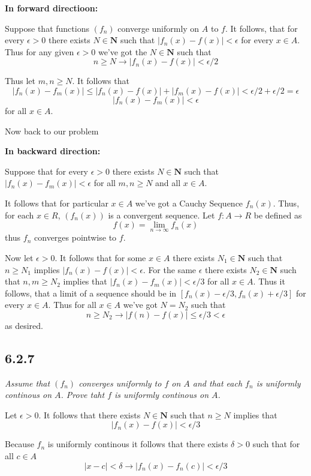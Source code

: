 \documentclass[11pt,oneside,titlepage]{book}
\begin{document}
\textbf{In forward directioon:}

Suppose that functions $(f_n)$ converge uniformly on $A$ to $f$. It follows,
that for every $\epsilon > 0$ there exists $N \in \textbf{N}$ such that
$|f_n(x) - f(x)| < \epsilon$ for every $x \in A$. Thus for any given
$\epsilon > 0$ we've got the $N \in \textbf{N}$ such that
$$n \geq N \to |f_n(x) - f(x)| < \epsilon / 2$$

Thus let $m, n \geq N$. It follows that
$$|f_n(x) - f_m(x)| \leq |f_n(x) - f(x)| + |f_m(x) - f(x)| < \epsilon/2 + \epsilon/2 = \epsilon$$
$$|f_n(x) - f_m(x)| <  \epsilon$$
for all $x \in A$.

Now back to our problem

\textbf{In backward direction:}

Suppose that for every $\epsilon > 0$ there exists $N \in \textbf{N}$ such
that $|f_n(x) - f_m(x)| < \epsilon$ for all $m, n \geq N$ and all $x \in A$.

It follows that for particular $x \in A$ we've got a Cauchy Sequence
$f_n(x)$. Thus, for each $x \in R$, $(f_n(x))$ is a convergent sequence.
Let $f: A \to R$ be defined as
$$f(x) = \lim_{n \to \infty}f_n(x)$$
thus $f_n$ converges pointwise to $f$.

Now let $\epsilon > 0$. It follows that for some $x \in A$ there exists
$N_1 \in \textbf{N}$ such that $n \geq N_1$ implies
$|f_n(x) - f(x)| < \epsilon$. For the same $\epsilon$ there exists
$N_2 \in \textbf{N}$ such that $n, m \geq N_2$ implies that
$|f_n(x) - f_m(x)| < \epsilon/3$ for all $x \in A$. Thus
it follows, that a limit of a sequence should be in $[f_n(x) - \epsilon/3,
f_n(x) + \epsilon/3]$ for every $x \in A$. Thus for all $x \in A$
we've got $N = N_2$ such that
$$n \geq N_2 \to |f(n) - f(x)| \leq \epsilon/ 3 < \epsilon$$
as desired.

\subsection*{6.2.7}
\textit{Assume that $(f_n)$ converges uniformly to $f$ on $A$ and that each
  $f_n$ is uniformly continous on $A$. Prove taht $f$ is uniformly continous
  on $A$.}

Let $\epsilon > 0$. It follows that there exists $N \in \textbf{N}$ such that
$n \geq N$ implies that
$$|f_n(x) - f(x)| < \epsilon/3$$

Because $f_n$ is
uniformly continous it follows that there exists $\delta > 0$ such that
for all $c \in A$
$$|x - c| < \delta  \to |f_n(x) - f_n(c)| < \epsilon/3$$
\end{document}
